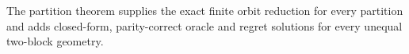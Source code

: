 The partition theorem supplies the exact finite orbit reduction for every partition and adds closed-form, parity-correct oracle and regret solutions for every unequal two-block geometry.